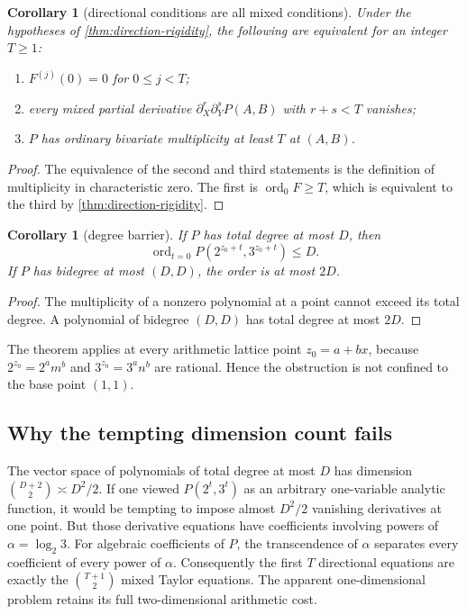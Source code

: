 \documentclass[11pt,oneside]{article}
\newtheorem{corollary}[theorem]{Corollary}
\theoremstyle{definition}
\theoremstyle{remark}
\newcommand{\ord}{\operatorname{ord}}
\begin{document}
\begin{corollary}[directional conditions are all mixed conditions]\label{cor:mixed-conditions}
Under the hypotheses of \cref{thm:direction-rigidity}, the following are
equivalent for an integer $T\ge1$:
\begin{enumerate}
\item $F^{(j)}(0)=0$ for $0\le j<T$;
\item every mixed partial derivative
$\partial_X^r\partial_Y^sP(A,B)$ with $r+s<T$ vanishes;
\item $P$ has ordinary bivariate multiplicity at least $T$ at $(A,B)$.
\end{enumerate}
\end{corollary}

\begin{proof}
The equivalence of the second and third statements is the definition of
multiplicity in characteristic zero.  The first is $\ord_0F\ge T$, which is
equivalent to the third by \cref{thm:direction-rigidity}.
\end{proof}

\begin{corollary}[degree barrier]\label{cor:degree-barrier}
If $P$ has total degree at most $D$, then
\[
 \ord_{t=0}P(2^{z_0+t},3^{z_0+t})\le D.
\]
If $P$ has bidegree at most $(D,D)$, the order is at most $2D$.
\end{corollary}

\begin{proof}
The multiplicity of a nonzero polynomial at a point cannot exceed its total
degree.  A polynomial of bidegree $(D,D)$ has total degree at most $2D$.
\end{proof}

The theorem applies at every arithmetic lattice point $z_0=a+bx$, because
$2^{z_0}=2^am^b$ and $3^{z_0}=3^an^b$ are rational.  Hence the obstruction is
not confined to the base point $(1,1)$.

\subsection{Why the tempting dimension count fails}

The vector space of polynomials of total degree at most $D$ has dimension
$\binom{D+2}{2}\asymp D^2/2$.  If one viewed
$P(2^t,3^t)$ as an arbitrary one-variable analytic function, it would be
tempting to impose almost $D^2/2$ vanishing derivatives at one point.  But
those derivative equations have coefficients involving powers of
$\alpha=\log_2 3$.  For algebraic coefficients of $P$, the transcendence
of $\alpha$ separates every coefficient of every power of $\alpha$.
Consequently the first $T$ directional equations are exactly the
$\binom{T+1}{2}$ mixed Taylor equations.  The apparent one-dimensional
problem retains its full two-dimensional arithmetic cost.
\end{document}
